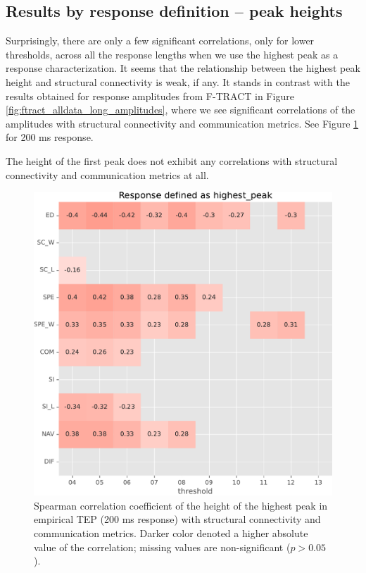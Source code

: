 \subsection{Results by response definition -- peak heights}

Surprisingly, there are only a few significant correlations, only for lower thresholds, across all the response lengths when we use the highest peak as a response characterization. It seems that the relationship between the highest peak height and structural connectivity is weak, if any. It stands in contrast with the results obtained for response amplitudes from F-TRACT in Figure \ref{fig:ftract_alldata_long_amplitudes}, where we see significant correlations of the amplitudes with structural connectivity and communication metrics. See Figure \ref{fig:tms_heighest_200} for 200 ms response.

The height of the first peak does not exhibit any correlations with structural connectivity and communication metrics at all. 

\begin{figure}
    \centering
    \includegraphics[width=\textwidth]{images/nootebook_generated/pytepfit_results/empirical/200/not_over_threshold_nan/Response defined as highest_peak.pdf}
    \caption[TEPs highest peak (200 ms) correlations]{Spearman correlation coefficient of the height of the highest peak in empirical TEP (200 ms response) with structural connectivity and communication metrics. Darker color denoted a higher absolute value of the correlation; missing values are non-significant ($p>0.05$).}
    \label{fig:tms_heighest_200}
\end{figure}

